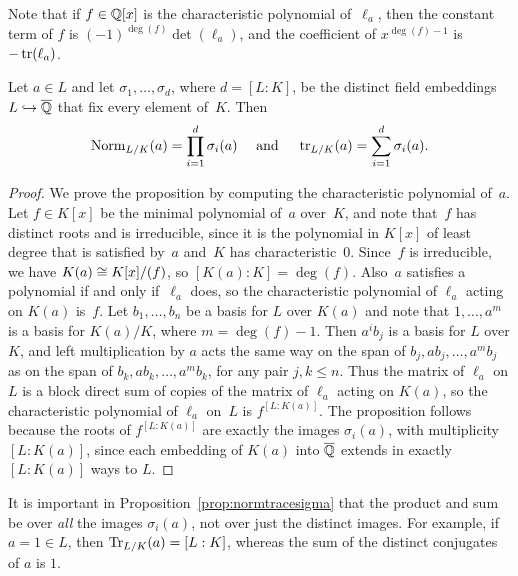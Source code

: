 Note that if $f\in\mathbb{Q}[x]$ is the characteristic polynomial of~$\ell_a$,
then the constant term of $f$ is $(-1)^{\deg(f)}\det(\ell_a)$, and the
coefficient of $x^{\deg(f)-1}$ is $-\operatorname{tr}(\ell_a)$.

\begin{proposition}\label{prop:normtracesigma}
	Let $a\in L$ and let $\sigma_1,\ldots, \sigma_d$, where $d=[L:K]$, be
	the distinct field embeddings $L\hookrightarrow \overline{\mathbb{Q}}$ that fix every element
	of~$K$.  Then
	$$
		\operatorname{Norm}_{L/K}(a) = \prod_{i=1}^d \sigma_i(a)
		\quad\text{ and }\quad
		\operatorname{tr}_{L/K}(a) = \sum_{i=1}^d \sigma_i(a).
	$$
\end{proposition}
\begin{proof}
	We prove the proposition by computing the characteristic
	polynomial of~$a$.  Let $f\in K[x]$ be the minimal polynomial
	of~$a$ over~$K$, and note that~$f$ has distinct roots and is
	irreducible, since it is the polynomial in $K[x]$ of least degree
	that is satisfied by~$a$ and~$K$ has characteristic~$0$.  Since~$f$
	is irreducible, we have $K(a) \cong K[x]/(f)$, so $[K(a):K]=\deg(f)$.
	Also~$a$ satisfies a polynomial if and only if~$\ell_a$ does, so the
	characteristic polynomial of $\ell_a$ acting on $K(a)$ is~$f$.  Let
	$b_1,\ldots,b_n$ be a basis for $L$ over $K(a)$ and note that
	$1,\ldots, a^m$ is a basis for $K(a)/K$, where $m=\deg(f)-1$.  Then
	$a^i b_j$ is a basis for $L$ over $K$, and left multiplication by
	$a$ acts the same way on the span of $b_j, a b_j, \ldots, a^m b_j$
	as on the span of $b_k, a b_k, \ldots, a^m b_k$, for any pair $j,
	k\leq n$.  Thus the matrix of $\ell_a$ on $L$ is a block direct sum
	of copies of the matrix of $\ell_a$ acting on $K(a)$, so the
	characteristic polynomial of $\ell_a$ on~$L$ is $f^{[L:K(a)]}$.  The
	proposition follows because the roots of $f^{[L:K(a)]}$ are exactly
	the images $\sigma_i(a)$, with multiplicity $[L:K(a)]$, since each
	embedding of $K(a)$ into $\overline{\mathbb{Q}}$ extends in exactly $[L:K(a)]$ ways
	to $L$.
\end{proof}

It is important in Proposition~\ref{prop:normtracesigma} that
the product and sum be over {\em all} the images $\sigma_i(a)$,
not over just the distinct images.  For example, if $a=1\in L$, then
$\operatorname{Tr}_{L/K}(a) = [L:K]$, whereas the sum of the distinct conjugates
of $a$ is $1$.

